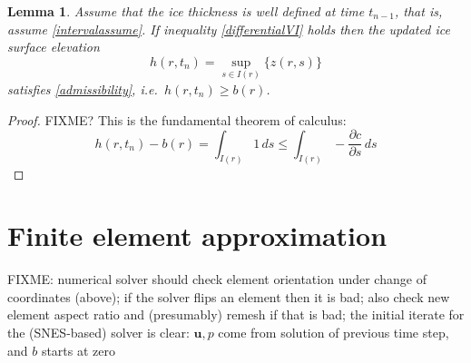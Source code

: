 \documentclass[letterpaper,final,12pt,reqno]{amsart}
\newcommand{\bu}{\mathbf{u}}
\newtheorem{lemma}{Lemma}
\begin{document}
\begin{lemma}
Assume that the ice thickness is well defined at time $t_{n-1}$, that is, assume
\eqref{intervalassume}.  If inequality \eqref{differentialVI} holds then the updated ice surface elevation
    $$h(r,t_n) = \sup_{s\in I(r)}\{z(r,s)\}$$
satisfies \eqref{admissibility}, i.e.~$h(r,t_n)\ge b(r)$.
\end{lemma}

\begin{proof}
FIXME? This is the fundamental theorem of calculus:
    $$h(r,t_n) - b(r) = \int_{I(r)} 1\,ds \le \int_{I(r)} - \frac{\partial c}{\partial s}\,ds$$
\end{proof}


\section{Finite element approximation}  \label{sec:finiteelement}

FIXME: numerical solver should check element orientation under change of coordinates (above); if the solver flips an element then it is bad; also check new element aspect ratio and (presumably) remesh if that is bad; the initial iterate for the (SNES-based) solver is clear: $\bu,p$ come from solution of previous time step, and $b$ starts at zero



\small

\bigskip


\end{document}
